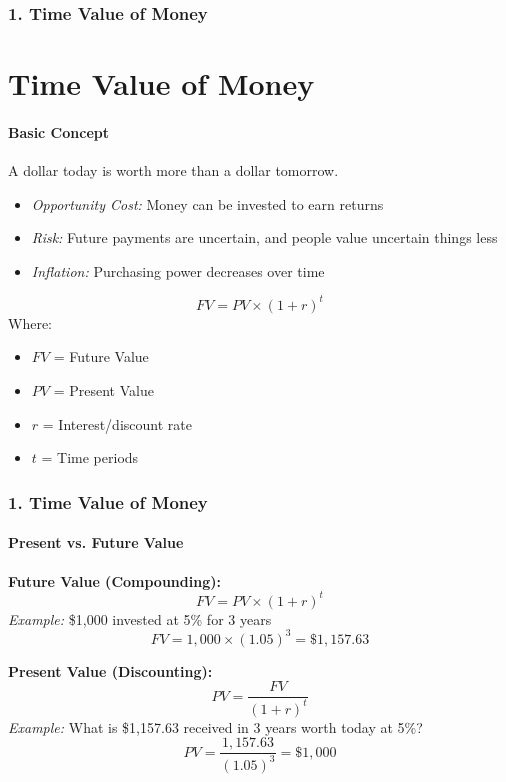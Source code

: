 \documentclass{beamer}
\begin{document}
\begin{foundframe}[t]
    \frametitle{1. Time Value of Money}
    \section{Time Value of Money}
    \framesubtitle{Basic Concept}

    A dollar today is worth more than a dollar tomorrow.\\
    \vspace{1em}

    \begin{itemize}
        \item \textit{Opportunity Cost:} Money can be invested to earn returns
        \item \textit{Risk:} Future payments are uncertain, and people value uncertain things less
        \item \textit{Inflation:} Purchasing power decreases over time
    \end{itemize}

    $$FV = PV \times (1 + r)^t$$
    Where:
    \begin{itemize}
        \item $FV$ = Future Value
        \item $PV$ = Present Value
        \item $r$ = Interest/discount rate
        \item $t$ = Time periods
    \end{itemize}

\end{foundframe}

\begin{foundframe}[t]
    \frametitle{1. Time Value of Money}
    \framesubtitle{Present vs. Future Value}

    \textbf{Future Value (Compounding):}
    $$FV = PV \times (1 + r)^t$$
    \textit{Example:} \$1,000 invested at 5\% for 3 years
    $$FV = 1,000 \times (1.05)^3 = \$1,157.63$$

    \textbf{Present Value (Discounting):}
    $$PV = \frac{FV}{(1 + r)^t}$$
    \textit{Example:} What is \$1,157.63 received in 3 years worth today at 5\%?
    $$PV = \frac{1,157.63}{(1.05)^3} = \$1,000$$

\end{foundframe}
\end{document}

